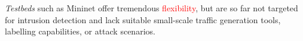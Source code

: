 \documentclass{article}
\begin{document}
 \textit{Testbeds} such as Mininet offer tremendous \textcolor{red}{flexibility}, but are so far not targeted for intrusion detection and lack suitable small-scale traffic generation tools, labelling capabilities, or attack scenarios. 



%
%
%
%
%
%
%
%
%
%
%
%
%
%
%
%
%
%
%
%
%
%
%
%
%
%
%
%
%
%
%
\end{document}
